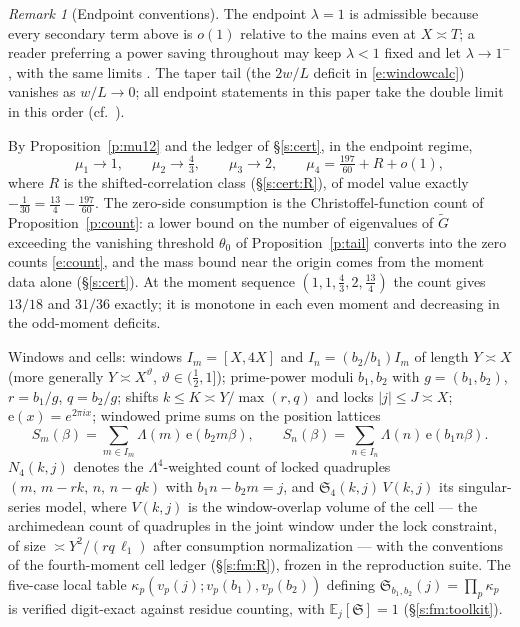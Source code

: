 \documentclass[11pt]{article}
\numberwithin{equation}{section}
\theoremstyle{definition}
\theoremstyle{remark}
\newtheorem{remark}[theorem]{Remark}
\newcommand{\LL}{\Lambda}
\newcommand{\SSS}{\mathfrak{S}}
\newcommand{\e}{\mathrm{e}}
\begin{document}
\begin{remark}[Endpoint conventions]\label{r:endpoint}
The endpoint $\lambda=1$ is admissible because every secondary
term above is $o(1)$ relative to the mains even at $X\asymp T$;
a reader preferring a power saving throughout may keep
$\lambda<1$ fixed and let $\lambda\to1^-$, with the same
limits \cite[Rem.~6.1]{C26}. The taper tail (the $2w/L$ deficit
in \eqref{e:windowcalc}) vanishes as $w/L\to0$; all endpoint
statements in this paper take the double limit in this order
(cf.\ \cite[\S7.1]{C26}).
\end{remark}

By Proposition~\ref{p:mu12} and the ledger of \S\ref{s:cert},
in the endpoint regime,
\begin{equation}\label{e:moments}
\mu_1\to1,\qquad \mu_2\to\tfrac43,\qquad \mu_3\to2,\qquad
\mu_4=\tfrac{197}{60}+R+o(1),
\end{equation}
where $R$ is the shifted-correlation class (\S\ref{s:cert:R}),
of model value exactly $-\tfrac1{30}=\tfrac{13}4-\tfrac{197}{60}$.
The zero-side consumption is the Christoffel-function count of
Proposition~\ref{p:count}: a lower bound on the number of
eigenvalues of $\widetilde G$ exceeding the vanishing threshold
$\theta_0$ of Proposition~\ref{p:tail} converts into the zero
counts \eqref{e:count}, and the mass bound near the origin comes
from the moment data alone (\S\ref{s:cert}). At the moment sequence
$(1,1,\tfrac43,2,\tfrac{13}4)$ the count gives $13/18$ and
$31/36$ exactly; it is monotone in each even moment and
decreasing in the odd-moment deficits.

Windows and cells: windows $I_m=[X,4X]$ and $I_n=(b_2/b_1)I_m$ of
length $Y\asymp X$ (more generally $Y\asymp X^{\vartheta}$,
$\vartheta\in(\tfrac12,1]$); prime-power moduli $b_1,b_2$ with
$g=(b_1,b_2)$, $r=b_1/g$, $q=b_2/g$; shifts $k\le K\asymp
Y/\max(r,q)$ and locks $|j|\le J\asymp X$; $\e(x)=e^{2\pi ix}$;
windowed prime sums on the position lattices
\[
S_m(\beta)=\sum_{m\in I_m}\LL(m)\,\e(b_2m\beta),
\qquad
S_n(\beta)=\sum_{n\in I_n}\LL(n)\,\e(b_1n\beta).
\]
$N_4(k,j)$ denotes the $\LL^4$-weighted count of locked
quadruples $(m,\,m-rk,\,n,\,n-qk)$ with $b_1n-b_2m=j$, and
$\SSS_4(k,j)\,V(k,j)$ its singular-series model, where
$V(k,j)$ is the window-overlap volume of the cell --- the
archimedean count of quadruples in the joint window under the
lock constraint, of size $\asymp Y^{2}/(rq\,\ell_1)$ after
consumption normalization --- with the conventions of the
fourth-moment cell ledger (\S\ref{s:fm:R}), frozen in the
reproduction suite. The five-case local table
$\kappa_p(v_p(j);v_p(b_1),v_p(b_2))$ defining
$\SSS_{b_1,b_2}(j)=\prod_p\kappa_p$ is verified digit-exact
against residue counting, with $\mathbb E_j[\SSS]=1$
(\S\ref{s:fm:toolkit}).
\end{document}
